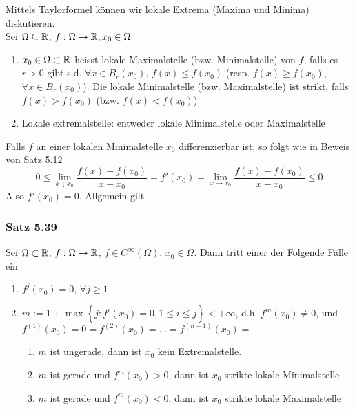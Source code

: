 \noindent Mittels Taylorformel können wir lokale Extrema (Maxima und Minima) diskutieren. \\

\noindent Sei $\Omega\subseteq\mathbb{R}$, $f:\Omega\to\mathbb{R}, x_0\in\Omega$

\begin{definition}{5.38}
\begin{enumerate}
\item $x_0\in\Omega\subset\mathbb{R}$ heisst lokale Maximalstelle (bzw. Minimalstelle) von $f$, falls es $r>0$ gibt s.d. $\forall x\in B_r(x_0)$, $f(x)\leq f(x_0)$ (resp. $f(x)\geq f(x_0)$, $\forall x\in B_r(x_0)$). Die lokale Minimalstelle (bzw. Maximalstelle) ist strikt, falls $f(x)>f(x_0)$ (bzw. $f(x)<f(x_0)$)
\item Lokale extremalstelle: entweder lokale Minimalstelle oder Maximalstelle
\end{enumerate}
\end{definition}
Falls $f$ an einer lokalen Minimalstelle $x_0$ differenzierbar ist, so folgt wie in Beweis von Satz 5.12 
\[0\leq \lim\limits_{x\downarrow x_0}\frac{f(x)-f(x_0)}{x-x_0}=f'(x_0)=\lim\limits_{x\to x_0}\frac{f(x)-f(x_0)}{x-x_0}\leq 0\]
Also $f'(x_0)=0$. Allgemein gilt
\subsubsection*{Satz 5.39}
Sei $\Omega\subset\mathbb{R}$, $f:\Omega\to\mathbb{R}$, $f\in C^{\infty}\left( \Omega\right)$, $x_0\in\Omega$. Dann tritt einer der Folgende Fälle ein
\begin{enumerate}
\item $f^j(x_0)=0$, $\forall j\geq 1$
\item $m:=1+\max\left\{ j:f^i(x_0)=0, 1\leq i\leq j \right\} <+\infty $, d.h. $f^m(x_0)\not=0$, und $f^{(1)}(x_0)=0=f^{(2)}(x_0)=\dots=f^{(n-1)}(x_0)=$
\begin{enumerate}
\item[\hspace{4mm}(2.1)] $m$ ist ungerade, dann ist $x_0$ kein Extremalstelle.
\item[\hspace{4mm}(2.2)] $m$ ist gerade und $f^m(x_0)>0$, dann ist $x_0$ strikte lokale Minimalstelle
\item[\hspace{4mm}(2.3)] $m$ ist gerade und $f^m(x_0)<0$, dann ist $x_0$ strikte lokale Maximalstelle
\end{enumerate}
\end{enumerate}

